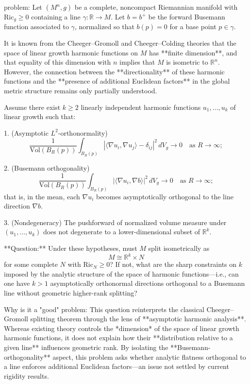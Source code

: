 problem:  
Let \((M^n,g)\) be a complete, noncompact Riemannian manifold with \(\mathrm{Ric}_g\ge 0\) containing a line \(\gamma:\mathbb{R}\to M\).  
Let \(b=b^+\) be the forward Busemann function associated to \(\gamma\), normalized so that \(b(p)=0\) for a base point \(p\in \gamma\).

It is known from the Cheeger–Gromoll and Cheeger–Colding theories that the space of linear growth harmonic functions on \(M\) has **finite dimension**, and that equality of this dimension with \(n\) implies that \(M\) is isometric to \(\mathbb{R}^n\).  
However, the connection between the **directionality** of these harmonic functions and the **presence of additional Euclidean factors** in the global metric structure remains only partially understood.

Assume there exist \(k\ge 2\) linearly independent harmonic functions \(u_1,\dots,u_k\) of linear growth such that:

1. (Asymptotic \(L^2\)-orthonormality)
   \[
   \frac{1}{\mathrm{Vol}(B_R(p))}\int_{B_R(p)}
   |\langle\nabla u_i,\nabla u_j\rangle-\delta_{ij}|^2\,dV_g\to0
   \quad\text{as }R\to\infty;
   \]

2. (Busemann orthogonality)
   \[
   \frac{1}{\mathrm{Vol}(B_R(p))}\int_{B_R(p)}
   |\langle\nabla u_i,\nabla b\rangle|^2\,dV_g\to0
   \quad\text{as }R\to\infty;
   \]
   that is, in the mean, each \(\nabla u_i\) becomes asymptotically orthogonal to the line direction \(\nabla b\).

3. (Nondegeneracy)
   The pushforward of normalized volume measure under \((u_1,\dots,u_k)\) does not degenerate to a lower-dimensional subset of \(\mathbb{R}^k\).

**Question:**  
Under these hypotheses, must \(M\) split isometrically as 
\[
M \cong \mathbb{R}^k \times N
\]
for some complete \(N\) with \(\mathrm{Ric}_N\ge 0\)?  
If not, what are the sharp constraints on \(k\) imposed by the analytic structure of the space of harmonic functions—i.e., can one have \(k>1\) asymptotically orthonormal directions orthogonal to a Busemann line without geometric higher-rank splitting?

Why is it a "good" problem:  
This question reinterprets the classical Cheeger–Gromoll splitting theorem through the lens of **asymptotic harmonic analysis**.  
Whereas existing theory controls the *dimension* of the space of linear growth harmonic functions, it does not explain how their **distribution relative to a given line** influences geometric rank. By isolating the **Busemann-orthogonality** aspect, this problem asks whether analytic flatness orthogonal to a line enforces additional Euclidean factors—an issue not settled by current rigidity results.

